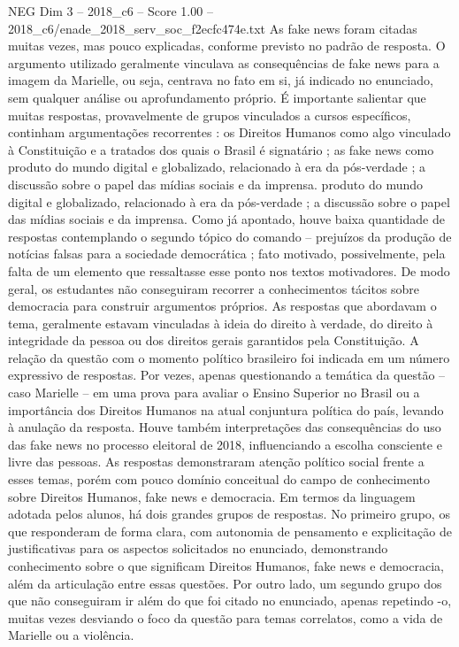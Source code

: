 \begin{textsample}{NEG Dim 3 – 2018\_c6 – Score 1.00 – 2018\_c6/enade\_2018\_serv\_soc\_f2ecfc474e.txt}
As fake news foram citadas muitas vezes, mas pouco explicadas, conforme previsto no padrão de resposta.
O argumento utilizado geralmente vinculava as consequências de fake news para a imagem da Marielle, ou seja, centrava no fato em si, já indicado no enunciado, sem qualquer análise ou aprofundamento próprio.
É importante salientar que muitas respostas, provavelmente de grupos vinculados a cursos específicos, continham argumentações recorrentes : os Direitos Humanos como algo vinculado à Constituição e a tratados dos quais o Brasil é signatário ; as fake news como produto do mundo digital e globalizado, relacionado à era da pós-verdade ; a discussão sobre o papel das mídias sociais e da imprensa. produto do mundo digital e globalizado, relacionado à era da pós-verdade ; a discussão sobre o papel das mídias sociais e da imprensa.
Como já apontado, houve baixa quantidade de respostas contemplando o segundo tópico do comando – prejuízos da produção de notícias falsas para a sociedade democrática ; fato motivado, possivelmente, pela falta de um elemento que ressaltasse esse ponto nos textos motivadores.
De modo geral, os estudantes não conseguiram recorrer a conhecimentos tácitos sobre democracia para construir argumentos próprios.
As respostas que abordavam o tema, geralmente estavam vinculadas à ideia do direito à verdade, do direito à integridade da pessoa ou dos direitos gerais garantidos pela Constituição.
A relação da questão com o momento político brasileiro foi indicada em um número expressivo de respostas.
Por vezes, apenas questionando a temática da questão – caso Marielle – em uma prova para avaliar o Ensino Superior no Brasil ou a importância dos Direitos Humanos na atual conjuntura política do país, levando à anulação da resposta.
Houve também interpretações das consequências do uso das fake news no processo eleitoral de 2018, influenciando a escolha consciente e livre das pessoas.
As respostas demonstraram atenção político social frente a esses temas, porém com pouco domínio conceitual do campo de conhecimento sobre Direitos Humanos, fake news e democracia.
Em termos da linguagem adotada pelos alunos, há dois grandes grupos de respostas.
No primeiro grupo, os que responderam de forma clara, com autonomia de pensamento e explicitação de justificativas para os aspectos solicitados no enunciado, demonstrando conhecimento sobre o que significam Direitos Humanos, fake news e democracia, além da articulação entre essas questões.
Por outro lado, um segundo grupo dos que não conseguiram ir além do que foi citado no enunciado, apenas repetindo -o, muitas vezes desviando o foco da questão para temas correlatos, como a vida de Marielle ou a violência.

\end{textsample}
